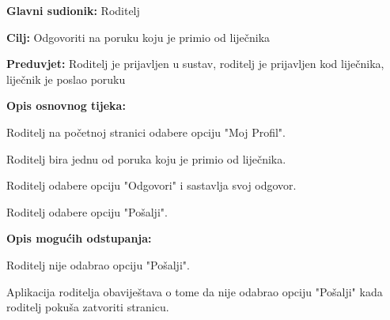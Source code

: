 					\noindent {}
					\begin{packed_item}
						
						\item \textbf{Glavni sudionik: }Roditelj
						\item  \textbf{Cilj:} Odgovoriti na poruku koju je primio od liječnika
						\item  \textbf{Preduvjet:} Roditelj je prijavljen u sustav, roditelj je prijavljen kod liječnika, liječnik je poslao poruku
						\item  \textbf{Opis osnovnog tijeka:}
						
						\item[] \begin{packed_enum}
							
							\item Roditelj na početnoj stranici odabere opciju "Moj Profil".
							\item Roditelj bira jednu od poruka koju je primio od liječnika.
							\item Roditelj odabere opciju "Odgovori" i sastavlja svoj odgovor.
							\item Roditelj odabere opciju "Pošalji".
						\end{packed_enum}
						
						\item  \textbf{Opis mogućih odstupanja:}
						
						\item[] \begin{packed_item}
							
							\item[4.a] Roditelj nije odabrao opciju "Pošalji".
							\item[] \begin{packed_enum}
								
								\item Aplikacija roditelja obaviještava o tome da nije odabrao opciju "Pošalji" kada roditelj pokuša zatvoriti stranicu.
							\end{packed_enum}
							
							
						\end{packed_item}
						
						
					\end{packed_item}
					

